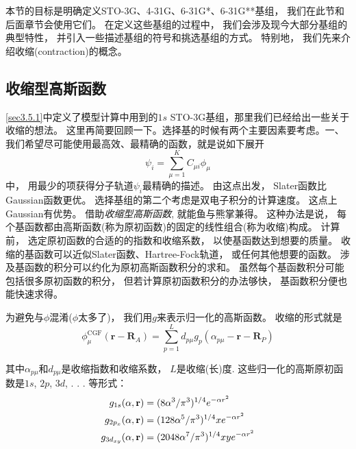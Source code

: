 本节的目标是明确定义STO-3G、4-31G、6-31G*、6-31G**基组，
我们在此节和后面章节会使用它们。
在定义这些基组的过程中，
我们会涉及现今大部分基组的典型特性，
并引入一些描述基组的符号和挑选基组的方式。
特别地，
我们先来介绍收缩(contraction)的概念。

\subsection{收缩型高斯函数}
\ref{sec3.5.1}中定义了模型计算中用到的$1s$ STO-3G基组，那里我们已经给出一些关于收缩的想法。
这里再简要回顾一下。选择基的时候有两个主要因素要考虑。一、我们希望尽可能使用最高效、最精确的函数，就是说如下展开
\begin{equation}
	\psi_i=\sum_{\mu=1}^{K}C_{\mu i}\phi_\mu
\end{equation}
中，
用最少的项获得分子轨道$\psi_i$最精确的描述。
由这点出发，
Slater函数比Gaussian函数更优。
选择基组的第二个考虑是双电子积分的计算速度。
这点上Gaussian有优势。
借助\emph{收缩型高斯函数}, 
就能鱼与熊掌兼得。
这种办法是说，
每个基函数都由高斯函数(称为原初函数)的固定的线性组合(称为收缩)构成。
计算前，
选定原初函数的合适的的指数和收缩系数，
以使基函数达到想要的质量。
收缩的基函数可以近似Slater函数、Hartree-Fock轨道，
或任何其他想要的函数。
涉及基函数的积分可以约化为原初高斯函数积分的求和。
虽然每个基函数积分可能包括很多原初函数的积分，
但若计算原初函数积分的办法够快，
基函数积分便也能快速求得。


为避免与$\phi$混淆($\phi$太多了)，
我们用$g$来表示归一化的高斯函数。
收缩的形式就是
\begin{equation}
	\phi^\mathrm{CGF}_\mu(\mathbf{r-R}_A)=\sum_{p=1}^{L}d_{p\mu}g_p(\alpha_{p\mu}-\mathbf{r-R}_P)
	\label{3.283}
\end{equation}

其中$\alpha_{p\mu}$和$d_{p\mu}$是收缩指数和收缩系数，
$L$是收缩(长)度. 
这些归一化的高斯原初函数是$1s$, 
$2p$, 
$3d$, 
.
.
.
等形式：
\begin{align}
	g_{1s}(\alpha,\mathbf{r})      & = (8\alpha^3/\pi^3)^{1/4}       e^{-\alpha r^2}\\
	g_{2p_x}(\alpha,\mathbf{r})    & = (128\alpha^5/\pi^3)^{1/4}  x  e^{-\alpha r^2}\\
	g_{3d_{xy}}(\alpha,\mathbf{r}) & = (2048\alpha^7/\pi^3)^{1/4} xy e^{-\alpha r^2}
\end{align}

